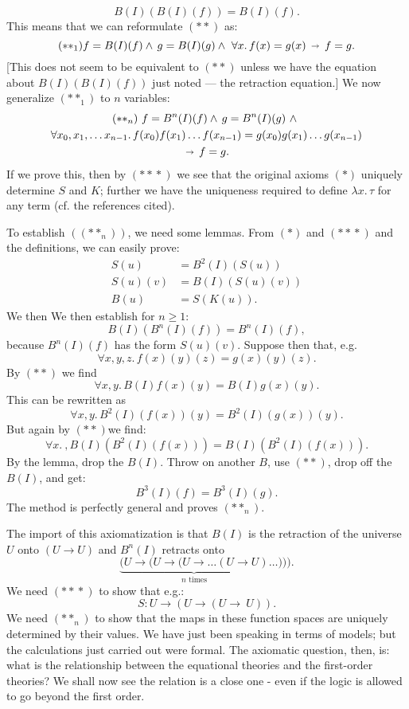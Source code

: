 \documentclass[12pt]{article}
\def\to{\rightarrow}
\def\imp{\shortrightarrow}
\def\lm#1.#2{\lambda#1.\, #2}
\def\U{U}
\def\sss{(*\!*\!*)}
\def\ss{(**)}
\def\ssn{(**_n)}
\begin{document}
$$
B(I)(B(I)(f)) = B(I)(f).
$$
This means that we can reformulate $\ss$ as:
$$
(**_1) f = B(I)(f) \land\, g = B(I)(g) \land\,\, \forall x.\,f(x) = g(x)	\, \imp\, f = g.
$$
[This does not seem to be equivalent to $\ss$ unless we have the
equation about $B(I)(B(I)(f))$ just noted --- the retraction equation.] We now generalize $(**_1)$ to $n$ variables:
\begin{multline*}
\ssn \,\,
f = B^n(I)(f) \land\, g = B^n(I)(g) \,\,\land\,\, \\
\forall x_0, x_1, \dots x_{n-1}.\,f(x_0)f(x_1)\dots f(x_{n-1}) = g(x_0)g(x_1)\dots g(x_{n-1})\\
 \, \imp\, f = g.
\end{multline*}
If we prove this, then by $\sss$ we see that the original axioms $(*)$ uniquely determine $S$ and $K$; further we have the uniqueness required to define $\lm{x}.\tau$ for any term (cf. the references cited).

To establish $(\ssn)$, we need some lemmas.  From $(*)$ and $\sss$ and the definitions, we can easily prove:
\begin{align*}
S(u) &= B^2(I)(S(u))\\
S(u)(v) &= B(I)(S(u)(v))\\
B(u) &= S(K(u)).
\end{align*}
%
We then We then establish for $n\geq 1$:
$$
B(I)(B^n(I)(f)) = B^n(I)(f),
$$
because $B^n(I)(f)$ has the form $S(u)(v)$. Suppose then that, e.g.
$$
\forall x, y, z .\, f(x)(y)(z) = g(x)(y)(z).
$$
By $\ss$ we find
$$
\forall x, y. \, B(I)f(x)(y) = B(I)g(x)(y).
$$
This can be rewritten as
$$
\forall x,y. \, B^2(I)(f(x))(y) = B^2(I)(g(x))(y).
$$
But again by $\ss$we find:
$$
\forall x.\ , B(I)(B^2(I)(f(x)))=B(I)(B^2(I)(f(x))).
$$
By the lemma, drop the $B(I)$. Throw on another $B$, use $\ss$, drop off the $B(I)$, and get:
$$
B^3(I)(f) = B^3(I)(g).
$$
The method is perfectly general and proves $(**_n)$.

The import of this axiomatization is that $B(I)$ is the retraction of the universe $\U$ onto $(\U \to \U)$ and $B^n (I)$ retracts onto
$$
\underbrace{(\U \to (\U \to (\U \to \dots (\U \to \U)}_{n {\textrm{ times}}} \dots ))).
$$
We need $\sss$ to show that e.g.:
$$
S: \U \to (\U \to (\U \to\ U)).
$$
We need $(**_n)$ to show that the maps in these function spaces are uniquely determined by their values.
We have just been speaking in terms of models; but the calculations just carried out were formal. The axiomatic question, then, is: what is the relationship between the equational theories and the first-order theories? We shall now see the relation is a close one - even if the logic is allowed to go beyond the first order.
\end{document}
